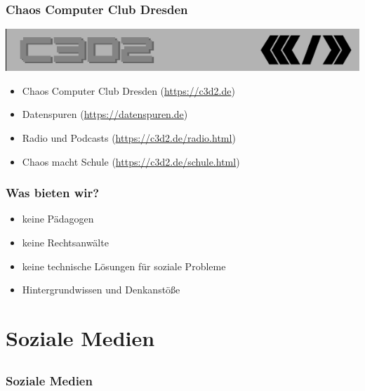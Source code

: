 \documentclass[12pt]{beamer}
\begin{document}
\begin{frame}
	\frametitle{Chaos Computer Club Dresden}
	\begin{center}
		\includegraphics[height=0.1\textheight]{img/c3d2_logo.png}
	\end{center}
	\begin{itemize}
		\item Chaos Computer Club Dresden (\url{https://c3d2.de})          
		\item Datenspuren (\url{https://datenspuren.de})
		\item Radio und Podcasts (\url{https://c3d2.de/radio.html})
		\item Chaos macht Schule (\url{https://c3d2.de/schule.html})
	\end{itemize}
\end{frame}

\begin{frame}
	\frametitle{Was bieten wir?}
	\begin{itemize}
		\item<2-> keine Pädagogen
		\item<3-> keine Rechtsanwälte
		\item<4-> keine technische Lösungen für soziale Probleme
		\item<5-> Hintergrundwissen und Denkanstöße
	\end{itemize}
\end{frame}
  
\section{Soziale Medien}
\subsection{}

\begin{frame}
  \frametitle{Soziale Medien}
  \begin{center}
  \end{center}
\end{frame}
\end{document}
